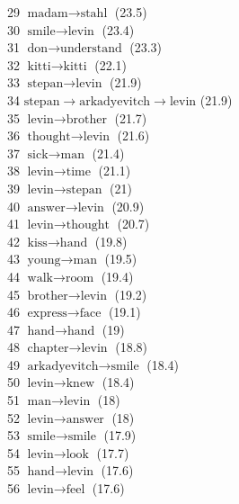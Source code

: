 \begin{appendices}
    29  $ \text{madam} \to \text{stahl} $ (23.5) \\
    30  $ \text{smile} \to \text{levin} $ (23.4) \\
    31  $ \text{don} \to \text{understand} $ (23.3) \\
    32  $ \text{kitti} \to \text{kitti} $ (22.1) \\
    33  $ \text{stepan} \to \text{levin} $ (21.9) \\
    34  $ \text{stepan} \to \text{arkadyevitch} \to \text{levin} $ (21.9) \\
    35  $ \text{levin} \to \text{brother} $ (21.7) \\
    36  $ \text{thought} \to \text{levin} $ (21.6) \\
    37  $ \text{sick} \to \text{man} $ (21.4) \\
    38  $ \text{levin} \to \text{time} $ (21.1) \\
    39  $ \text{levin} \to \text{stepan} $ (21) \\
    40  $ \text{answer} \to \text{levin} $ (20.9) \\
    41  $ \text{levin} \to \text{thought} $ (20.7) \\
    42  $ \text{kiss} \to \text{hand} $ (19.8) \\
    43  $ \text{young} \to \text{man} $ (19.5) \\
    44  $ \text{walk} \to \text{room} $ (19.4) \\
    45  $ \text{brother} \to \text{levin} $ (19.2) \\
    46  $ \text{express} \to \text{face} $ (19.1) \\
    47  $ \text{hand} \to \text{hand} $ (19) \\
    48  $ \text{chapter} \to \text{levin} $ (18.8) \\
    49  $ \text{arkadyevitch} \to \text{smile} $ (18.4) \\
    50  $ \text{levin} \to \text{knew} $ (18.4) \\
    51  $ \text{man} \to \text{levin} $ (18) \\
    52  $ \text{levin} \to \text{answer} $ (18) \\
    53  $ \text{smile} \to \text{smile} $ (17.9) \\
    54  $ \text{levin} \to \text{look} $ (17.7) \\
    55  $ \text{hand} \to \text{levin} $ (17.6) \\
    56  $ \text{levin} \to \text{feel} $ (17.6) \\

\end{appendices}
